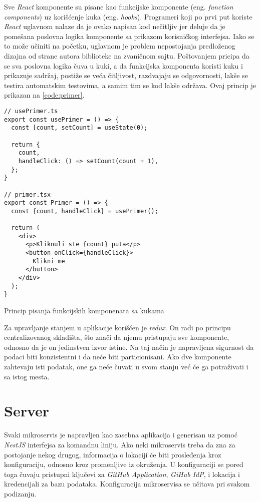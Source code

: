 Sve \textit{React} komponente su pisane kao funkcijske komponente 
(eng. \textit{function components}) uz korišćenje kuka (eng. \textit{hooks}).
Programeri koji po prvi put koriste \textit{React} uglavnom nalaze da je 
ovako napisan kod nečitljiv jer deluje da je pomešana poslovna logika komponente 
sa prikazom korisničkog interfejsa. Iako se to može učiniti na početku, uglavnom je 
problem nepostojanja predloženog dizajna od strane autora biblioteke na 
zvaničnom sajtu. Poštovanjem pricipa da se sva poslovna logika 
čuva u kuki, a da funkcijska komponenta koristi kuku i prikazuje sadržaj, 
postiže se veća čitljivost, razdvajaju se odgovornosti, lakše se testira 
automatskim testovima, a samim tim se kod lakše održava. 
Ovaj princip je prikazan na \ref{code:primer}.

\begin{listing}[H]
  \centering
\begin{verbatim}
// usePrimer.ts
export const usePrimer = () => {
  const [count, setCount] = useState(0);

  return {
    count,
    handleClick: () => setCount(count + 1),
  };
}

// primer.tsx
export const Primer = () => {
  const {count, handleClick} = usePrimer();

  return (
    <div>
      <p>Kliknuli ste {count} puta</p>
      <button onClick={handleClick}>
        Klikni me
      </button>
    </div>
  );
}
\end{verbatim}
\caption{Princip pisanja funkcijskih komponenata sa kukama}
\label{code:primer}
\end{listing}

Za upravljanje stanjem u aplikacije korišćen je \textit{redux}. On radi 
po principu centralizovanog skladišta, što znači da njemu pristupaju sve 
komponente, odnosno da je on jedinstven izvor istine. Na taj način je 
napravljena sigurnost da podaci biti konzistentni i da neće biti particionisani.
Ako dve komponente zahtevaju isti podatak, one ga neće čuvati u svom stanju 
već će ga potraživati i sa istog mesta.

\section{Server}
Svaki mikroservis je napravljen kao zasebna aplikacija i generisan uz pomoć 
\textit{NestJS} interfejsa za komandnu liniju. Ako neki mikroservis treba 
da zna za postojanje nekog drugog, informacija o lokaciji će biti prosleđenja 
kroz konfiguraciju, odnosno kroz promenljive iz okruženja. U konfiguraciji 
se pored toga čuvaju pristupni ključevi za \textit{GitHub Application}, 
\textit{GiHub IdP}, i lokacija i kredencijali za bazu podataka. Konfiguracija 
mikroservisa se učitava pri svakom podizanju.

